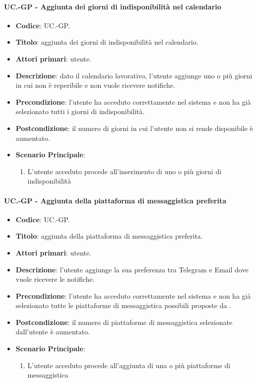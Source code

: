 	\paragraph{UC\theuccount.\thesubuccount-GP - Aggiunta dei giorni di indisponibilità nel calendario}
		
		\begin{itemize}
			\item \textbf{Codice}: UC\theuccount.\thesubuccount-GP.
			\item \textbf{Titolo}: aggiunta dei giorni di indisponibilità nel calendario.
			\item \textbf{Attori primari}: utente.
			\item \textbf{Descrizione}: dato il calendario lavorativo, l’utente aggiunge uno o più giorni in cui non è reperibile e non vuole ricevere notifiche.
			\item \textbf{Precondizione}: l’utente ha acceduto correttamente nel sistema e non ha già selezionato tutti i giorni di indisponibilità.
			\item \textbf{Postcondizione}: il numero di giorni in cui l’utente non si rende disponibile è aumentato.
			\item \textbf{Scenario Principale}:
			\begin{enumerate}
				\item L'utente acceduto procede all'inserimento di uno o più giorni di indisponibilità
			\end{enumerate}
		\end{itemize}
	
	\paragraph{UC\theuccount.\thesubuccount-GP - Aggiunta della piattaforma di messaggistica preferita}
		
		\begin{itemize}
			\item \textbf{Codice}: UC\theuccount.\thesubuccount-GP.
			\item \textbf{Titolo}: aggiunta della piattaforma di messaggistica preferita.
			\item \textbf{Attori primari}: utente.
			\item \textbf{Descrizione}: l’utente aggiunge la sua preferenza tra Telegram e Email dove vuole ricevere le notifiche.
			\item \textbf{Precondizione}: l’utente ha acceduto correttamente nel sistema e non ha già selezionato tutte le piattaforme di messaggistica possibili proposte da \progetto.
			\item \textbf{Postcondizione}: il numero di piattaforme di messaggistica selezionate dall’utente è aumentato.
			\item \textbf{Scenario Principale}:
			\begin{enumerate}
				\item L'utente acceduto procede all'aggiunta di una o più piattaforme di messaggistica
			\end{enumerate}
		\end{itemize}
	
